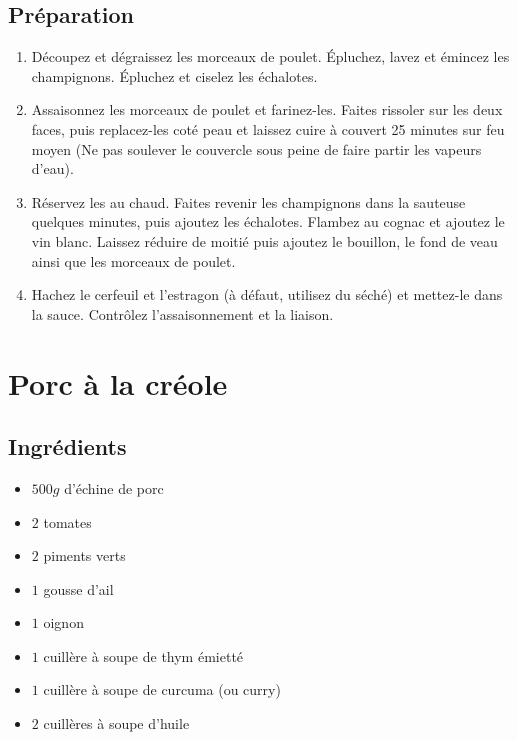

\subsection*{Préparation}
\begin{enumerate}
\item Découpez et dégraissez les morceaux de poulet. Épluchez, lavez et émincez les champignons. Épluchez et ciselez les échalotes.
\item Assaisonnez les morceaux de poulet et farinez-les. Faites rissoler sur les deux faces, puis replacez-les coté peau et laissez cuire à couvert 25 minutes sur feu moyen (Ne pas soulever le couvercle sous peine de faire partir les vapeurs d'eau).
\item Réservez les au chaud. Faites revenir les champignons dans la sauteuse quelques minutes, puis ajoutez les échalotes. Flambez au cognac et ajoutez le vin blanc. Laissez réduire de moitié puis ajoutez le bouillon, le fond de veau ainsi que les morceaux de poulet.
\item  Hachez le cerfeuil et l'estragon (à défaut, utilisez du séché) et mettez-le dans la sauce. Contrôlez l'assaisonnement et la liaison.
\end{enumerate}

\newpage
\section{Porc à la créole}%
\subsection*{Ingrédients}
\begin{itemize}
\item $500 \unit{g}$ d'échine de porc
\item $2$ tomates
\item $2$ piments verts
\item $1$ gousse d'ail
\item $1$ oignon
\item $1$ cuillère à soupe de thym émietté
\item $1$ cuillère à soupe de curcuma (ou curry)
\item $2$ cuillères à soupe d'huile
\end{itemize}

